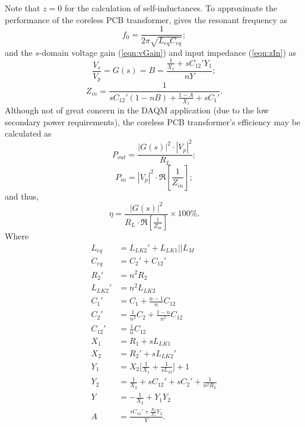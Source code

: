 \documentclass[conference]{IEEEtran}
\begin{document}
\hspace{-15pt}Note that $z = 0$ for the calculation of self-inductances. 
To approximate the performance of the coreless PCB transformer, \cite{TangHuiFundamental} gives the resonant frequency as
%
\begin{equation}
	f_{0} = \frac{1}{2\pi\sqrt{L_{eq}C_{eq}}};
\end{equation}
%
and the $s$-domain voltage gain (\ref{eqn:vGain}) and input impedance (\ref{eqn:zIn}) as
%
\begin{equation}
	\label{eqn:vGain}
	\frac{V_{s}}{V_{p}} = G(s) = B = \frac{\frac{1}{X_{1}}+sC_{12}'Y_{1}}{nY};
\end{equation}
%
\begin{equation}
	\label{eqn:zIn}
	Z_{in} = \frac{1}{sC_{12}'(1-nB)+\frac{1-A}{X_{1}}+sC_{1}'}.
\end{equation}
%
Although not of great concern in the DAQM application (due to the low secondary power requirements), the coreless PCB transformer's efficiency \cite{TangHuiFundamental} may be calculated as
\begin{equation}
	P_{out} = \frac{|G(s)|^{2}\cdot|V_{p}|^{2}}{R_{L}};
\end{equation}
\begin{equation}
	P_{in} = |V_{p}|^{2}\cdot\Re \left[ \frac{1}{Z_{in}} \right];
\end{equation}
and thus,
\begin{equation}
	\eta = \frac{|G(s)|^{2}}{R_{L}\cdot\Re \left[ \frac{1}{Z_{in}} \right]}\times 100 \%.
\end{equation}
%
Where
\vspace{-5pt}
\begin{align*}
	L_{eq}   &= L_{LK2}'+L_{LK1}||L_{M} 	\\
	C_{eq}   &= C_{2}'+C_{12}'				\\
	R_{2}'   &= n^{2}R_{2}					\\
	L_{LK2}' &= n^{2}L_{LK2}				\\
	C_{1}'   &= C_{1} + \frac{n-1}{n}C_{12}	\\
	C_{2}'   &= \frac{1}{n^{2}}C_{2} + \frac{1-n}{n^{2}}C_{12}	\\
	C_{12}'  &= \frac{1}{n}C_{12}			\\
	X_{1}    &= R_{1}  + sL_{LK1}			\\
	X_{2}    &= R_{2}' + sL_{LK2}'			\\
	Y_{1}    &= X_{2} \lbrack \frac{1}{X_{1}} + \frac{1}{sL_{M}} \rbrack +1	\\
	Y_{2}    &= \frac{1}{X_{2}} + sC_{12}' + sC_{2}' + \frac{1}{n^{2}R_{L}}	\\
	Y        &= -\frac{1}{X_{2}} + Y_{1}Y_{2}	\\
	A        &= \frac{sC_{12}' + \frac{X_{2}}{X_{1}} Y_{2}}{Y}.
\end{align*}
%
\end{document}
